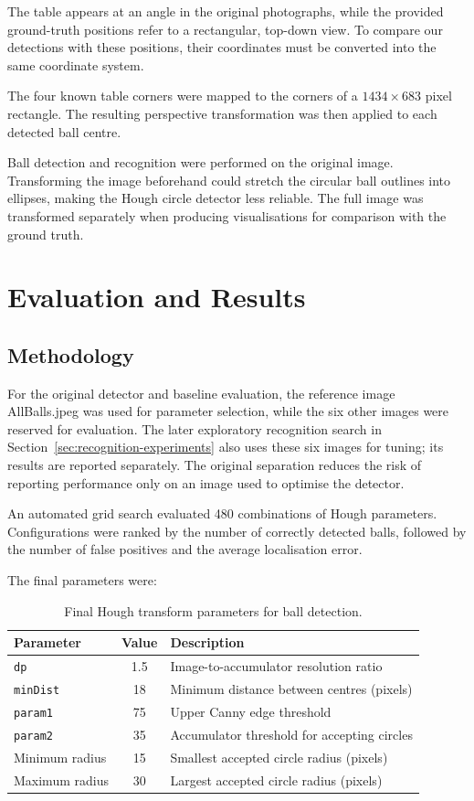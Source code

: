 \documentclass[10pt,a4paper]{article}
\begin{document}
The table appears at an angle in the original photographs, while the
provided ground-truth positions refer to a rectangular, top-down view.
To compare our detections with these positions, their coordinates must
be converted into the same coordinate system.

The four known table corners were mapped to the corners of a
$1434 \times 683$ pixel rectangle. The resulting perspective
transformation was then applied to each detected ball centre.

Ball detection and recognition were performed on the original image.
Transforming the image beforehand could stretch the circular ball
outlines into ellipses, making the Hough circle detector less reliable.
The full image was transformed separately when producing visualisations
for comparison with the ground truth.

\section{Evaluation and Results}
\subsection{Methodology}

For the original detector and baseline evaluation, the reference image AllBalls.jpeg
was used for parameter selection, while the six other images were reserved for
evaluation. The later exploratory recognition search in
Section~\ref{sec:recognition-experiments} also uses these six images for tuning;
its results are reported separately. The original separation
reduces the risk of reporting performance only on an image used to optimise 
the detector.

An automated grid search evaluated 480 combinations of Hough parameters. 
Configurations were ranked by the number of correctly detected balls, 
followed by the number of false positives and the average localisation error.

The final parameters were: 

\begin{table}[htbp]
    \centering
    \caption{Final Hough transform parameters for ball detection.}
    \label{tab:hough-transform-parameters}
    \begin{tabular}{lcl}
        \toprule
        Parameter & Value & Description \\
        \midrule
        \texttt{dp}        & 1.5 & Image-to-accumulator resolution ratio \\
        \texttt{minDist}   & 18  & Minimum distance between centres (pixels) \\
        \texttt{param1}    & 75  & Upper Canny edge threshold \\
        \texttt{param2}    & 35  & Accumulator threshold for accepting circles \\
        Minimum radius    & 15  & Smallest accepted circle radius (pixels) \\
        Maximum radius    & 30  & Largest accepted circle radius (pixels) \\
        \bottomrule
    \end{tabular}
\end{table}
\FloatBarrier
\end{document}
